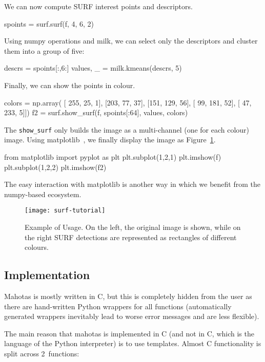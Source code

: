 \documentclass{article}
\newcommand*{\cpp}{{C\nolinebreak[4]\hspace{-.05em}\raisebox{.4ex}{\tiny\textbf{++}}}}
\begin{document}
We can now compute SURF interest points and descriptors.
\begin{python}
spoints = surf.surf(f, 4, 6, 2)
\end{python}

Using numpy operations and milk, we can select only the descriptors and cluster
them into a group of five:

\begin{python}
descrs = spoints[:,6:]
values, _ = milk.kmeans(descrs, 5)
\end{python}

Finally, we can show the points in colour.
\begin{python}
colors = np.array(
    [ 255,  25,   1],
    [203,  77,  37],
    [151, 129,  56],
    [ 99, 181,  52],
    [ 47, 233,   5]])
f2 = surf.show_surf(f, spoints[:64], values, colors)
\end{python}

The \texttt{show\_surf} only builds the image as a multi-channel (one for each
colour) image. Using matplotlib~\citep{10.1109/MCSE.2007.55}, we finally
display the image as Figure~\ref{fig:surf}.

\begin{python}
from matplotlib import pyplot as plt
plt.subplot(1,2,1)
plt.imshow(f)
plt.subplot(1,2,2)
plt.imshow(f2)
\end{python}

The easy interaction with matplotlib is another way in which we benefit from
the numpy-based ecosystem.

\begin{figure}
\begin{center}
\texttt{[image: surf-tutorial]}
\end{center}
\caption{Example of Usage. On the left, the original image is shown, while on
the right SURF detections are represented as rectangles of different colours.}
\label{fig:surf}
\end{figure}

\subsection{Implementation}

Mahotas is mostly written in \cpp, but this is completely hidden from the user
as there are hand-written Python wrappers for all functions (automatically
generated wrappers inevitably lead to worse error messages and are less
flexible).

The main reason that mahotas is implemented in \cpp{} (and not in C, which is
the language of the Python interpreter) is to use templates. Almost \cpp{}
functionality is split across 2~functions:
\end{document}

